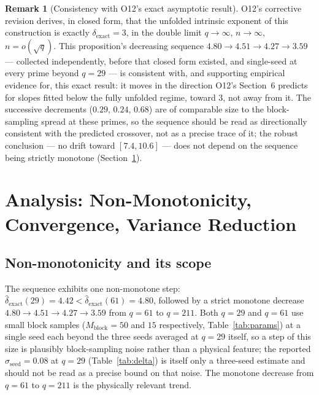\documentclass[11pt,a4paper]{article}
\theoremstyle{plain}
\theoremstyle{definition}
\newtheorem{remark}[theorem]{Remark}
\newcommand{\dhat}{\hat\delta_{\mathrm{exact}}}
\begin{document}
  \begin{remark}[Consistency with O12's exact asymptotic result]
    \label{rem:confirms-o12}
    O12's corrective revision derives, in closed form, that the unfolded
    intrinsic exponent of this construction is exactly $\delta_{\mathrm{exact}}=3$,
    in the double limit $q\to\infty$, $n\to\infty$, $n=o(\sqrt q)$.
    This proposition's decreasing sequence
    $4.80\to4.51\to4.27\to3.59$ — collected independently, before that closed
    form existed, and single-seed at every prime beyond $q=29$ — is consistent
    with, and supporting empirical evidence for, this exact result: it moves in
    the direction O12's Section~6 predicts for slopes fitted below the fully
    unfolded regime, toward $3$, not away from it.
    The successive decrements ($0.29$, $0.24$, $0.68$) are of comparable size to
    the block-sampling spread at these primes, so the sequence should be read
    as directionally consistent with the predicted crossover, not as a precise
    trace of it; the robust conclusion — no drift toward $[7.4,10.6]$ — does not
    depend on the sequence being strictly monotone (Section~\ref{sec:analysis}).
  \end{remark}

  \section{Analysis: Non-Monotonicity, Convergence, Variance Reduction}
  \label{sec:analysis}

  \subsection{Non-monotonicity and its scope}

    The sequence exhibits one non-monotone step: $\dhat(29) = 4.42 < \dhat(61) = 4.80$,
    followed by a strict monotone decrease $4.80 \to 4.51 \to 4.27 \to 3.59$ from
    $q = 61$ to $q = 211$.
    Both $q=29$ and $q=61$ use small block samples ($M_{\mathrm{block}}=50$ and
    $15$ respectively, Table~\ref{tab:params}) at a single seed each beyond the
    three seeds averaged at $q=29$ itself, so a step of this size is plausibly
    block-sampling noise rather than a physical feature; the reported
    $\sigma_{\mathrm{seed}}=0.08$ at $q=29$ (Table~\ref{tab:delta}) is itself
    only a three-seed estimate and should not be read as a precise bound on
    that noise.
    The monotone decrease from $q = 61$ to $q = 211$ is the physically relevant trend.
\end{document}
